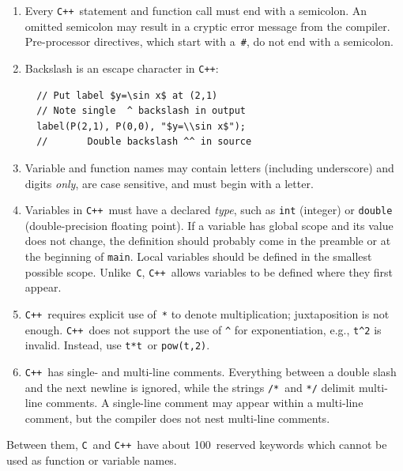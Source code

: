 \documentclass[12pt]{report}
\newcommand{\code}[1]{\texttt{#1}}
\newcommand{\C}{\code{C}}
\newcommand{\CXX}{\code{C++}}
\begin{document}
\begin{enumerate}
\item Every \CXX\ statement and function call must end with a
  semicolon. An omitted semicolon may result in a cryptic error
  message from the compiler. Pre-processor directives, which start
  with a~\code{\#}, do not end with a semicolon.

\item Backslash is an escape character in \CXX:
\begin{verbatim}
  // Put label $y=\sin x$ at (2,1)
  // Note single  ^ backslash in output
  label(P(2,1), P(0,0), "$y=\\sin x$"); 
  //       Double backslash ^^ in source
\end{verbatim}
  
\item Variable and function names may contain letters (including
  underscore) and digits \emph{only}, are case sensitive, and must
  begin with a letter.

\item Variables in \CXX\ must have a declared \emph{type}, such as
  \code{int} (integer) or \code{double} (double-precision floating
  point). If a variable has global scope and its value does not
  change, the definition should probably come in the preamble or at
  the beginning of \code{main}. Local variables should be defined in
  the smallest possible scope. Unlike~\C, \CXX\ allows variables to be
  defined where they first appear.
  
\item \CXX~requires explicit use of~\code{*} to denote multiplication;
  juxtaposition is not enough. \CXX~does not support the use of
  \verb+^+ for exponentiation, e.g., \verb+t^2+ is invalid. Instead,
  use \code{t*t}~or \code{pow(t,2)}.

\item \CXX\ has single- and multi-line comments. Everything between a
  double slash and the next newline is ignored, while the strings
  \verb+/*+~and \verb+*/+ delimit multi-line comments. A single-line
  comment may appear within a multi-line comment, but the compiler
  does not nest multi-line comments.

\end{enumerate}

Between them, \C~and \CXX~have about 100~reserved keywords which
cannot be used as function or variable names.
\end{document}

